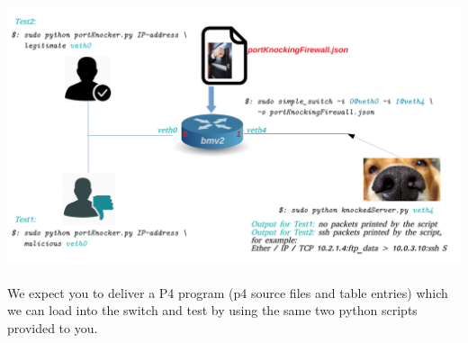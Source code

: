 \includegraphics[width=1\textwidth]{./images/testPortKnockFw.pdf}
~\\
 We expect you to deliver a P4 program (p4 source files and table entries) which we can load into the switch and test by using the same two python scripts provided to you.